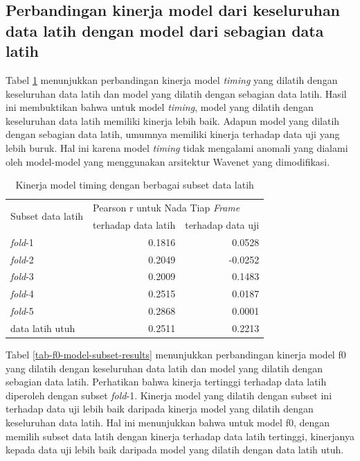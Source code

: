 \subsection{Perbandingan kinerja model dari keseluruhan data latih dengan model dari sebagian data latih}

Tabel \ref{tab-timing-model-subset-results} menunjukkan perbandingan kinerja model \textit{timing} yang dilatih dengan keseluruhan data latih dan model yang dilatih dengan sebagian data latih. Hasil ini membuktikan bahwa untuk model \textit{timing}, model yang dilatih dengan keseluruhan data latih memiliki kinerja lebih baik. Adapun model yang dilatih dengan sebagian data latih, umumnya memiliki kinerja terhadap data uji yang lebih buruk. Hal ini karena model \textit{timing} tidak mengalami anomali yang dialami oleh model-model yang menggunakan arsitektur Wavenet yang dimodifikasi.

\begin{table}[htbp]
    \centering
    \caption{Kinerja model timing dengan berbagai subset data latih}\label{tab-timing-model-subset-results}
    \begin{tabular}{ |l|r|r| } 
     \hline
     \multirow{2}{*}{Subset data latih} & \multicolumn{2}{l|}{Pearson r untuk Nada Tiap \textit{Frame}} \\
     \cline{2-3}
     & terhadap data latih & terhadap data uji \\\hline

	\textit{fold}-1          &0.1816  &0.0528\\\hline
	\textit{fold}-2          &0.2049 &-0.0252\\\hline
	\textit{fold}-3          &0.2009  &0.1483\\\hline
	\textit{fold}-4          &0.2515  &0.0187\\\hline
	\textit{fold}-5          &0.2868  &0.0001\\\hline
	data latih utuh			 &0.2511  &0.2213\\\hline
    \end{tabular}
\end{table}

Tabel \ref{tab-f0-model-subset-results} menunjukkan perbandingan kinerja model f0 yang dilatih dengan keseluruhan data latih dan model yang dilatih dengan sebagian data latih. Perhatikan bahwa kinerja tertinggi terhadap data latih diperoleh dengan subset \textit{fold}-1. Kinerja model yang dilatih dengan subset ini terhadap data uji lebih baik daripada kinerja model yang dilatih dengan keseluruhan data latih. Hal ini menunjukkan bahwa untuk model f0, dengan memilih subset data latih dengan kinerja terhadap data latih tertinggi, kinerjanya kepada data uji lebih baik daripada model yang dilatih dengan data latih utuh. 

